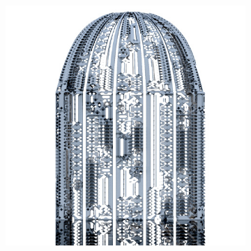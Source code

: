 \begin{figure}
        \centering
        \begin{subfigure}[b]{0.5\textwidth}
                \includegraphics[width=\textwidth]{img/Theory/Cellular_A/dome1.jpg}
                \caption{}
        \end{subfigure}%
          ~~
        \begin{subfigure}[b]{0.5\textwidth}

\end{subfigure}
\end{figure}
